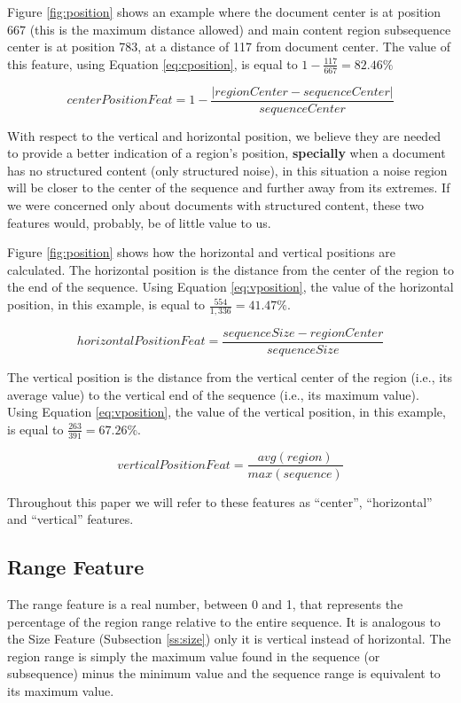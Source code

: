 Figure \ref{fig:position} shows an example where the document center is at
position 667 (this is the maximum distance allowed) and main content region
subsequence center is at position 783, at a distance of 117 from document
center. The value of this feature, using Equation \ref{eq:cposition}, is equal
to $1- \frac{117}{667} = 82.46\%$

\begin{equation}\label{eq:cposition}
    centerPositionFeat = 1 - \frac{|regionCenter - sequenceCenter|}{sequenceCenter}
\end{equation}

With respect to the vertical and horizontal position, we believe they are needed
to provide a better indication of a region's position, \textbf{specially} when a
document has no structured content (only structured noise), in this situation a
noise region will be closer to the center of the sequence and further away from
its extremes. If we were concerned only about documents with structured content,
these two features would, probably, be of little value to us.

Figure \ref{fig:position} shows how the horizontal and vertical positions are
calculated. The horizontal position is the distance from the center of the
region to the end of the sequence. Using Equation \ref{eq:vposition}, the value
of the horizontal position, in this example, is equal to $\frac{554}{1,336} =
41.47\%$.

\begin{equation}\label{eq:hposition}
    horizontalPositionFeat = \frac{sequenceSize - regionCenter}{sequenceSize}
\end{equation}

The vertical position is the distance from the vertical
center of the region (i.e., its average value) to the vertical end of the
sequence (i.e., its maximum value). Using Equation \ref{eq:vposition}, the value
of the vertical position, in this example, is equal to $\frac{263}{391} =
67.26\%$.

\begin{equation}\label{eq:vposition}
    verticalPositionFeat = \frac{avg(region)}{max(sequence)}
\end{equation}

Throughout this paper we will refer to these features as ``center'',
``horizontal'' and ``vertical'' features.

\subsection{Range Feature}\label{ss:range}
The range feature is a real number, between 0 and 1, that represents the
percentage of the region range relative to the entire sequence. It is analogous
to the Size Feature (Subsection \ref{ss:size}) only it is vertical instead of
horizontal. The region range is simply the maximum value found in the sequence
(or subsequence) minus the minimum value and the sequence range is equivalent
to its maximum value.

